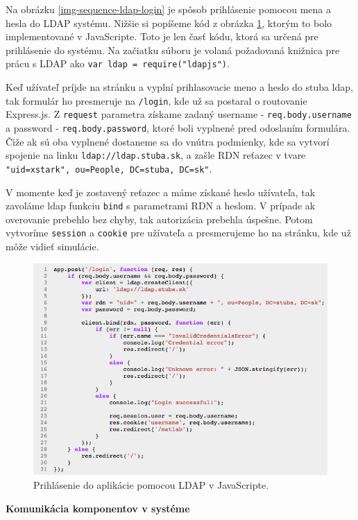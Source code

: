 Na obrázku \ref{img-sequence-ldap-login} je spôsob prihlásenie pomocou mena a hesla do LDAP systému. Nižšie si popíšeme kód z obrázka \ref{img-sequence-ldap-login-js}, ktorým to bolo implementované v JavaScripte. Toto je len časť kódu, ktorá sa určená pre prihlásenie do systému. Na začiatku súboru je volaná požadovaná knižnica pre prácu s LDAP ako \verb|var ldap = require("ldapjs")|.

Keď užívateľ príjde na stránku a vyplní prihlasovacie meno a heslo do stuba ldap, tak formulár ho presmeruje na \verb|/login|, kde už sa postaral o routovanie Express.js. Z \verb|request| parametra získame zadaný username - \verb|req.body.username| a password - \verb|req.body.password|, ktoré boli vyplnené pred odoslaním formulára. Čiže ak sú oba vyplnené dostaneme sa do vnútra podmienky, kde sa vytvorí spojenie na linku \verb|ldap://ldap.stuba.sk|, a zašle RDN reťazec v tvare \verb|"uid=xstark", ou=People, DC=stuba, DC=sk"|.

V momente keď je zostavený reťazec a máme získané heslo užívateľa, tak zavoláme ldap funkciu \verb|bind| s parametrami RDN a heslom. V prípade ak overovanie prebehlo bez chyby, tak autorizácia prebehla úspešne. Potom vytvoríme \verb|session| a \verb|cookie| pre užívateľa a presmerujeme ho na stránku, kde už môže vidieť simulácie.

\begin{figure}[H]
  \centering
  \includegraphics[scale=0.7]{img/code/ldap-login.png}
  \caption{Prihlásenie do aplikácie pomocou LDAP v JavaScripte.}
  \label{img-sequence-ldap-login-js}
\end{figure}

\noindent \textbf{Komunikácia komponentov v systéme}

